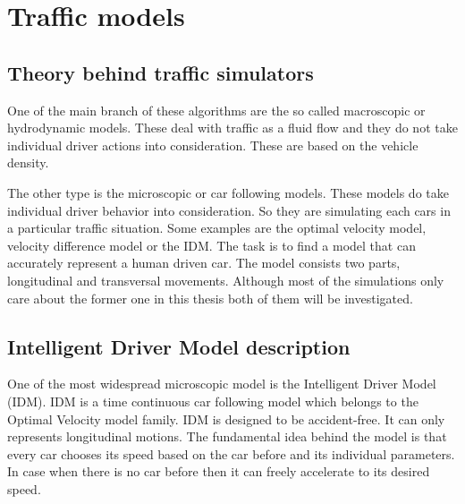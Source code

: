 \chapter{Traffic models}
	\section{Theory behind traffic simulators}
		One of the main branch of these algorithms are the so called macroscopic or hydrodynamic models. These deal with traffic as a fluid flow and they do not take individual driver actions into consideration. These are based on the vehicle density.

		The other type is the microscopic or car following models. These models do take individual driver behavior into consideration. So they are simulating each cars in a particular traffic situation. Some examples are the optimal velocity model, velocity difference model or the IDM. The task is to find a model that can accurately represent a human driven car. The model consists two parts, longitudinal and transversal movements. Although most of the simulations only care about the former one in this thesis both of them will be investigated.
	\section{Intelligent Driver Model description} \label{sec:IDM}
		One of the most widespread microscopic model is the Intelligent Driver Model (IDM). IDM is a time continuous car following model which belongs to the Optimal Velocity model family. IDM is designed to be accident-free. It can only represents longitudinal motions. The fundamental idea behind the model is that every car chooses its speed based on the car before and its individual parameters. In case when there is no car before then it can freely accelerate to its desired speed.

